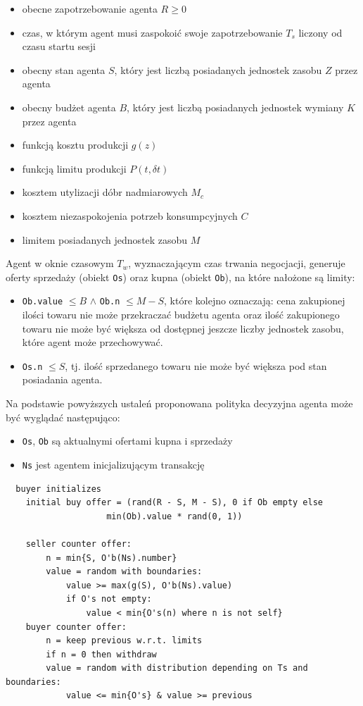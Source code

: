 \documentclass{article}
\providecommand{\tightlist}{%
  \setlength{\itemsep}{0pt}\setlength{\parskip}{0pt}}
\begin{document}
\begin{itemize}
\tightlist
\item
  obecne zapotrzebowanie agenta \(R \geq 0\)
\item
  czas, w którym agent musi zaspokoić swoje zapotrzebowanie \(T_s\)
  liczony od czasu startu sesji
\item
  obecny stan agenta \(S\), który jest liczbą posiadanych jednostek
  zasobu \(Z\) przez agenta
\item
  obecny budżet agenta \(B\), który jest liczbą posiadanych jednostek
  wymiany \(K\) przez agenta
\item
  funkcją kosztu produkcji \(g(z)\)
\item
  funkcją limitu produkcji \(P(t, \delta t)\)
\item
  kosztem utylizacji dóbr nadmiarowych \(M_c\)
\item
  kosztem niezaspokojenia potrzeb konsumpcyjnych \(C\)
\item
  limitem posiadanych jednostek zasobu \(M\)
\end{itemize}

Agent w oknie czasowym \(T_w\), wyznaczającym czas trwania negocjacji,
generuje oferty sprzedaży (obiekt \texttt{Os}) oraz kupna (obiekt
\texttt{Ob}), na które nałożone są limity:

\begin{itemize}
\tightlist
\item
  \texttt{Ob.value} \(\leq B\) \(\land\) \texttt{Ob.n} \(\leq M - S\),
  które kolejno oznaczają: cena zakupionej ilości towaru nie może
  przekraczać budżetu agenta oraz ilość zakupionego towaru nie może być
  większa od dostępnej jeszcze liczby jednostek zasobu, które agent może
  przechowywać.\\
\item
  \texttt{Os.n} \(\leq S\), tj. ilość sprzedanego towaru nie może być
  większa pod stan posiadania agenta.
\end{itemize}

Na podstawie powyższych ustaleń proponowana polityka decyzyjna agenta
może być wyglądać następująco:

\begin{itemize}
\tightlist
\item
  \texttt{Os}, \texttt{Ob} są
  aktualnymi ofertami kupna i sprzedaży
\item
  \texttt{Ns} jest agentem inicjalizującym transakcję
\end{itemize}
\begin{verbatim}
  buyer initializes
    initial buy offer = (rand(R - S, M - S), 0 if Ob empty else
                    min(Ob).value * rand(0, 1))
   
    seller counter offer:
        n = min{S, O'b(Ns).number}
        value = random with boundaries:
            value >= max(g(S), O'b(Ns).value)
            if O's not empty:
                value < min{O's(n) where n is not self}
    buyer counter offer:
        n = keep previous w.r.t. limits
        if n = 0 then withdraw
        value = random with distribution depending on Ts and boundaries:
            value <= min{O's} & value >= previous
\end{verbatim}
\end{document}
